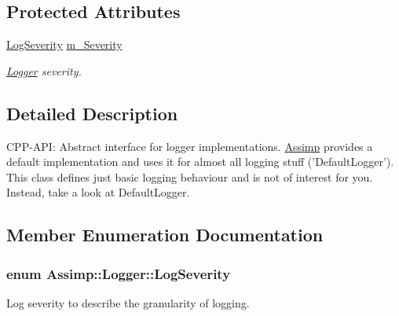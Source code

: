 \subsection*{Protected Attributes}
\begin{CompactItemize}
\item 
\hypertarget{class_assimp_1_1_logger_e1c96711eb927a5b33745a6211e93f56}{
\hyperlink{class_assimp_1_1_logger_8b6248a0fd062431e8572556350d29e6}{LogSeverity} \hyperlink{class_assimp_1_1_logger_e1c96711eb927a5b33745a6211e93f56}{m\_\-Severity}}
\label{class_assimp_1_1_logger_e1c96711eb927a5b33745a6211e93f56}

\begin{CompactList}\small\item\em \hyperlink{class_assimp_1_1_logger}{Logger} severity. \item\end{CompactList}\end{CompactItemize}


\subsection{Detailed Description}
CPP-API: Abstract interface for logger implementations. \hyperlink{namespace_assimp}{Assimp} provides a default implementation and uses it for almost all logging stuff ('DefaultLogger'). This class defines just basic logging behaviour and is not of interest for you. Instead, take a look at DefaultLogger. 

\subsection{Member Enumeration Documentation}
\hypertarget{class_assimp_1_1_logger_8b6248a0fd062431e8572556350d29e6}{
\subsubsection[LogSeverity]{\setlength{\rightskip}{0pt plus 5cm}enum {\bf Assimp::Logger::LogSeverity}}}
\label{class_assimp_1_1_logger_8b6248a0fd062431e8572556350d29e6}


Log severity to describe the granularity of logging. 

